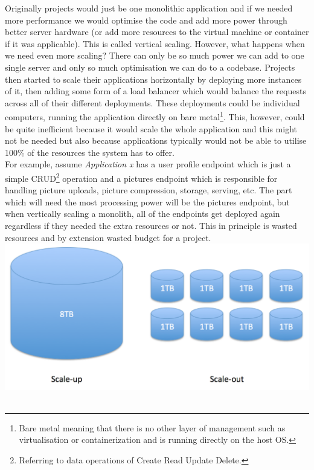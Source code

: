 \documentclass{article}
\begin{document}
\begin{multicols}{2}
Originally projects would just be one monolithic application and if we needed more performance we would optimise the code and add more power through better server hardware (or add more resources to the virtual machine or container if it was applicable). This is called vertical scaling. However, what happens when we need even more scaling? There can only be so much power we can add to one single server and only so much optimisation we can do to a codebase. Projects then started to scale their applications horizontally by deploying more instances of it, then adding some form of a load balancer which would balance the requests across all of their different deployments. These deployments could be individual computers, running the application directly on bare metal\footnote{Bare metal meaning that there is no other layer of management such as virtualisation or containerization and is running directly on the host OS.}. This, however, could be quite inefficient because it would scale the whole application and this might not be needed but also because applications typically would not be able to utilise 100\% of the resources the system has to offer.\\
For example, assume \textit{Application x} has a user profile endpoint which is just a simple CRUD\footnote{Referring to data operations of Create Read Update Delete.} operation and a pictures endpoint which is responsible for handling picture uploads, picture compression, storage, serving, etc. The part which will need the most processing power will be the pictures endpoint, but when vertically scaling a monolith, all of the endpoints get deployed again regardless if they needed the extra resources or not. This in principle is wasted resources and by extension wasted budget for a project.\\

\begingroup
\centering
\includegraphics[width=0.9\linewidth]{./miscAssets/ScaleUpVsScaleOut.png}
~\label{fig:ScaleOutVsIn}
\endgroup


\end{multicols}
\end{document}
